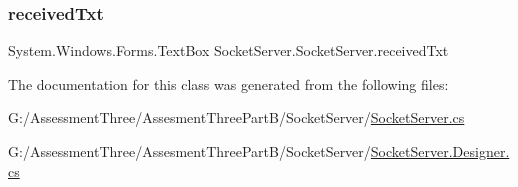 \mbox{\label{class_socket_server_1_1_socket_server_aea45323bf62d2f24f8992a0380fd1044}} 
\subsubsection{\texorpdfstring{received\+Txt}{receivedTxt}}
{\footnotesize\ttfamily System.\+Windows.\+Forms.\+Text\+Box Socket\+Server.\+Socket\+Server.\+received\+Txt\hspace{0.3cm}{\ttfamily [private]}}



The documentation for this class was generated from the following files\+:\begin{DoxyCompactItemize}
\item 
G\+:/\+Assessment\+Three/\+Assesment\+Three\+Part\+B/\+Socket\+Server/\hyperlink{_socket_server_8cs}{Socket\+Server.\+cs}\item 
G\+:/\+Assessment\+Three/\+Assesment\+Three\+Part\+B/\+Socket\+Server/\hyperlink{_socket_server_8_designer_8cs}{Socket\+Server.\+Designer.\+cs}\end{DoxyCompactItemize}
